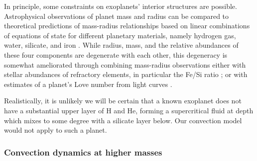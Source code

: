 In principle, some constraints on exoplanets' interior structures are possible. Astrophysical observations of planet mass and radius can be compared to theoretical predictions of mass-radius relationships based on linear combinations of equations of state for different planetary materials, namely hydrogen gas, water, silicate, and iron \citep{Seager2007, Valencia2007, Rogers2010, Dorn2018}. While radius, mass, and the relative abundances of these four components are degenerate with each other, this degeneracy is somewhat ameliorated through combining mass-radius observations either with stellar abundances of refractory elements, in particular the Fe/Si ratio \citep{Dorn2017a, Brugger2017}; or with estimates of a planet's Love number from light curves \citep{Kellermann2018}. 

Realistically, it is unlikely we will be certain that a known exoplanet does not have a substantial upper layer of H and He, forming a supercritical fluid at depth which mixes to some degree with a silicate layer below. Our convection model would not apply to such a planet.




\subsubsection{Convection dynamics at higher masses}

